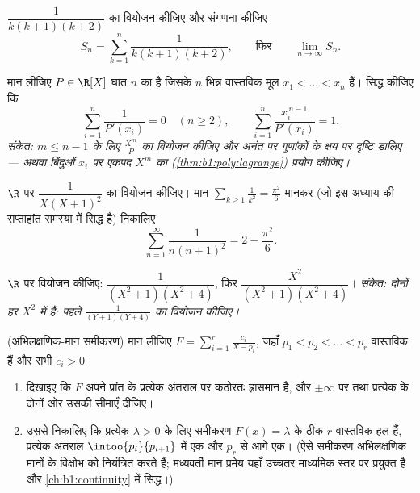 \begin{exercise}[$\star\star$]\label{exo:b1:fractions:8}
$\dfrac{1}{k(k+1)(k+2)}$ का वियोजन कीजिए और संगणना कीजिए
\[
S_n = \sum_{k=1}^{n} \frac{1}{k(k+1)(k+2)},
\qquad\text{फिर}\qquad
\lim_{n \to \infty} S_n .
\]
\end{exercise}

\begin{exercise}[$\star\star\star$]\label{exo:b1:fractions:9}
मान लीजिए $P \in \R[X]$ घात $n$ का  है जिसके $n$ भिन्न
वास्तविक मूल $x_1 < \dots < x_n$ हैं। सिद्ध कीजिए कि
\[
\sum_{i=1}^{n} \frac{1}{P'(x_i)} = 0 \quad (n \geq 2),
\qquad
\sum_{i=1}^{n} \frac{x_i^{\,n-1}}{P'(x_i)} = 1 .
\]
\emph{संकेत: $m \leq n - 1$ के लिए $\frac{X^m}{P}$ का वियोजन कीजिए और अनंत
पर गुणांकों के क्षय पर दृष्टि डालिए --- अथवा बिंदुओं $x_i$ पर एकपद $X^m$ का
 (\cref{thm:b1:poly:lagrange}) प्रयोग कीजिए।}
\end{exercise}

\begin{exercise}[$\star\star$]\label{exo:b1:fractions:10}
$\R$ पर $\dfrac{1}{X(X+1)^2}$ का वियोजन कीजिए। मान $\sum_{k \geq 1}
\frac1{k^2} = \frac{\pi^2}6$ मानकर (जो इस अध्याय की सप्ताहांत समस्या में
सिद्ध है) निकालिए
\[
\sum_{n=1}^{\infty} \frac{1}{n(n+1)^2} = 2 - \frac{\pi^2}{6} .
\]
\end{exercise}

\begin{exercise}[$\star\star$]\label{exo:b1:fractions:11}
$\R$ पर वियोजन कीजिए: $\dfrac{1}{(X^2+1)(X^2+4)}$, फिर
$\dfrac{X^2}{(X^2+1)(X^2+4)}$। \emph{संकेत: दोनों हर $X^2$ में  हैं:
पहले $\frac1{(Y+1)(Y+4)}$ का वियोजन कीजिए।}
\end{exercise}

\begin{exercise}[$\star\star\star$]\label{exo:b1:fractions:12}
(अभिलक्षणिक-मान समीकरण) मान लीजिए $F = \sum_{i=1}^{r} \frac{c_i}{X - p_i}$,
जहाँ $p_1 < p_2 < \dots < p_r$ वास्तविक हैं और सभी $c_i > 0$।
\begin{enumerate}
  \item दिखाइए कि $F$ अपने प्रांत के प्रत्येक अंतराल पर कठोरतः ह्रासमान है,
  और $\pm\infty$ पर तथा प्रत्येक  के दोनों ओर उसकी सीमाएँ दीजिए।
  \item उससे निकालिए कि प्रत्येक $\lambda > 0$ के लिए समीकरण $F(x) =
  \lambda$ के ठीक $r$ वास्तविक हल हैं, प्रत्येक अंतराल
  $\intoo{p_i}{p_{i+1}}$ में एक और $p_r$ से आगे एक। (ऐसे समीकरण अभिलक्षणिक
  मानों के विक्षोभ को नियंत्रित करते हैं; मध्यवर्ती मान प्रमेय यहाँ उच्चतर
  माध्यमिक स्तर पर प्रयुक्त है और \cref{ch:b1:continuity} में सिद्ध।)
\end{enumerate}
\end{exercise}

